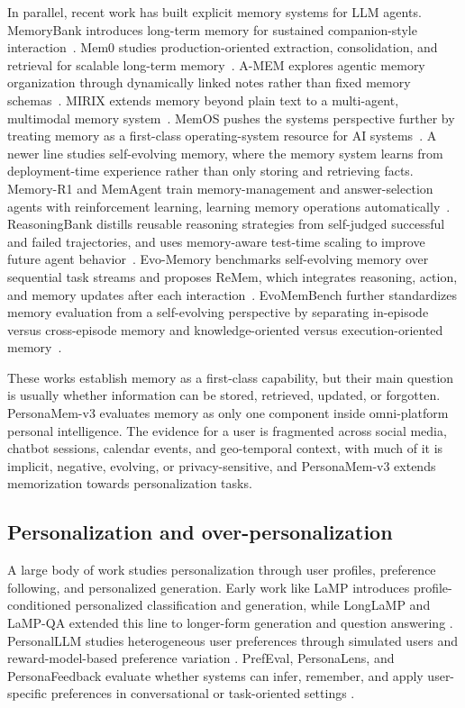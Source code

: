 \documentclass[]{fairmeta}
\begin{document}
In parallel, recent work has built explicit memory systems for LLM agents. MemoryBank introduces long-term memory for sustained companion-style interaction~\citep{zhong2024memorybank}. Mem0 studies production-oriented extraction, consolidation, and retrieval for scalable long-term memory~\citep{chhikara2025mem0}. A-MEM explores agentic memory organization through dynamically linked notes rather than fixed memory schemas~\citep{xu2025amem}. MIRIX extends memory beyond plain text to a multi-agent, multimodal memory system~\citep{wang2025mirix}. MemOS pushes the systems perspective further by treating memory as a first-class operating-system resource for AI systems~\citep{li2025memos}. A newer line studies self-evolving memory, where the memory system learns from deployment-time experience rather than only storing and retrieving facts. Memory-R1 and MemAgent train memory-management and answer-selection agents with reinforcement learning, learning memory operations automatically~\citep{yan2025memoryr1, yu2025memagent}. ReasoningBank distills reusable reasoning strategies from self-judged successful and failed trajectories, and uses memory-aware test-time scaling to improve future agent behavior~\citep{ouyang2026reasoningbank}. Evo-Memory benchmarks self-evolving memory over sequential task streams and proposes ReMem, which integrates reasoning, action, and memory updates after each interaction~\citep{wei2025evomemory}. EvoMemBench further standardizes memory evaluation from a self-evolving perspective by separating in-episode versus cross-episode memory and knowledge-oriented versus execution-oriented memory~\citep{wang2026evomembench}.

These works establish memory as a first-class capability, but their main question is usually whether information can be stored, retrieved, updated, or forgotten. PersonaMem-v3 evaluates memory as only one component inside omni-platform personal intelligence. The evidence for a user is fragmented across social media, chatbot sessions, calendar events, and geo-temporal context, with much of it is implicit, negative, evolving, or privacy-sensitive, and PersonaMem-v3 extends memorization towards personalization tasks.

\subsection{Personalization and over-personalization}

A large body of work studies personalization through user profiles, preference following, and personalized generation. Early work like LaMP introduces profile-conditioned personalized classification and generation, while LongLaMP and LaMP-QA extended this line to longer-form generation and question answering \citep{salemi2024lamp,kumar2024longlamp,salemi2025lampqa}. PersonalLLM studies heterogeneous user preferences through simulated users and reward-model-based preference variation \citep{zollo2024personalllm}. PrefEval, PersonaLens, and PersonaFeedback evaluate whether systems can infer, remember, and apply user-specific preferences in conversational or task-oriented settings \citep{zhao2025prefeval,zhao2025personalens,tao2025personafeedback}.
\end{document}

